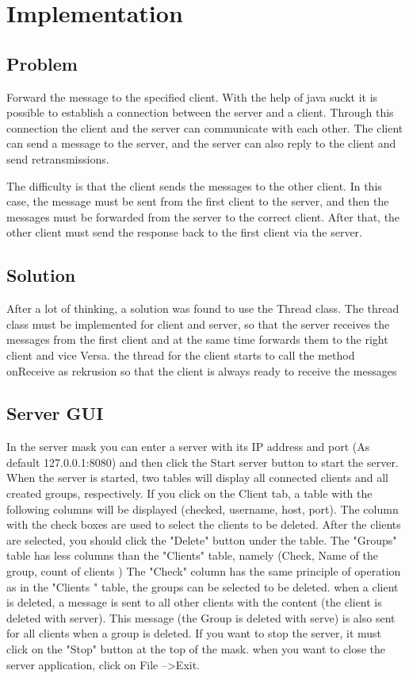 \newpage
\chapter{Implementation}
\section{Problem}


Forward the message to the specified client.
With the help of java suckt it is possible to establish a connection between the server and a client. Through this connection the client and the server can communicate with each other. 
The client can send a message to the server, and the server can also reply to the client and send retransmissions.

The difficulty is that the client sends the messages to the other client. 
In this case, the message must be sent from the first client to the server, and then the messages must be forwarded from the server to the correct client. 
After that, the other client must send the response back to the first client via the server.

\section{Solution}


After a lot of thinking, a solution was found to use the Thread class.
The thread class must be implemented for client and server, so that the server receives the messages
from the first client and at the same time forwards them to the right client and vice Versa.
the thread for the client starts to call the method onReceive as rekrusion so that the client is
always ready to receive the messages

\section{Server GUI}

In the server mask you can enter a server with its IP address and port (As default 127.0.0.1:8080)
and then click the Start server button to start the server. 
When the server is started, two tables will display all connected clients and all created groups, respectively.
If you click on the Client tab, a table with the following columns will be displayed (checked, username, host, port).
The column with the check boxes are used to select the clients to be deleted. 
After the clients are selected, you should click the "Delete" button under the table.
\medspace{}
The "Groups" table has less columns than the "Clients" table, namely (Check, Name of the group, count of clients )
The "Check" column has the same principle of operation as in the "Clients " table,
 the groups can be selected to be deleted. 
\medspace{}
 when a client is deleted, a message is sent to all other clients with the content (the client is deleted with server).
This message (the Group is deleted with serve) is also sent for all clients when a group is deleted. 
\medspace{}
If you want to stop the server, it must click on the "Stop" button at the top of the mask.
when you want to close the server application, click on File -->Exit.
